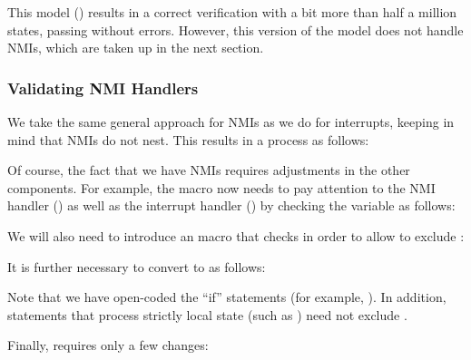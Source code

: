 This model ()
results in a correct verification with a bit more than half a million
states, passing without errors.
However, this version of the model does not handle NMIs,
which are taken up in the next section.

\subsubsection{Validating NMI Handlers}
\label{sec:formal:Validating NMI Handlers}

We take the same general approach for NMIs as we do for interrupts,
keeping in mind that NMIs do not nest.
This results in a  process as follows:



Of course, the fact that we have NMIs requires adjustments in
the other components.
For example, the  macro now needs to
pay attention to the NMI handler () as well
as the interrupt handler () by checking
the  variable as follows:



We will also need to introduce an 
macro that checks  in order to allow
 to exclude :



It is further necessary to convert 
to  as follows:



\begin{fcvref}
Note that we have open-coded the ``if'' statements
(for example, ).
In addition, statements that process strictly local state
(such as ) need not exclude .
\end{fcvref}

Finally,  requires only a few changes:



